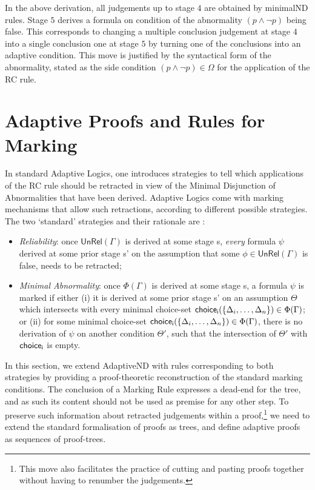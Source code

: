 \documentclass[]{article}
\newcommand{\Unrel}{\ensuremath{\mathsf{UnRel}}}
\begin{document}
In the above derivation, all judgements up to stage $4$ are obtained by {\sf minimalND} rules. Stage $5$ derives a formula on condition of the abnormality $(p\wedge \neg p)$ being false.  This corresponds to changing a multiple conclusion judgement at stage $4$ into a single conclusion one at stage $5$ by turning one of the conclusions into an adaptive condition. This move is justified by the syntactical form of the abnormality, stated as the side condition $(p \wedge \neg p)\in \Omega$ for the application of the {\sf RC} rule.



\section{Adaptive Proofs and Rules for Marking}\label{sec:marking}

In standard Adaptive Logics, one introduces strategies to tell which applications of the {\sf RC} rule should be retracted in view of the Minimal Disjunction of Abnormalities that have been derived. Adaptive Logics come with marking mechanisms that allow such retractions, according to different possible strategies. The two `standard' strategies and their rationale are \cite{batens01}:

\begin{itemize}
    \item \textit{Reliability}: once $\Unrel(\Gamma)$ is derived at some stage {\sf s}, \textit{every} formula $\psi$ derived at some prior stage {\sf s'} on the assumption that some $\phi\in \Unrel(\Gamma)$ is false, needs to be retracted;

\item \textit{Minimal Abnormality}: once $\Phi(\Gamma)$ is derived at some stage {\sf s}, a formula $\psi$ is marked if either (i) it is derived at some prior stage {\sf s'} on an assumption $\Theta$ which intersects with every minimal choice-set ${\sf choice_{i}}(\{\Delta_{i}, \ldots, \Delta_{n}\})\in \Phi(\Gamma)$; or (ii) for some minimal choice-set ${\sf choice_{i}}(\{\Delta_{i}, \ldots, \Delta_{n}\})\in \Phi(\Gamma)$, there is no derivation of $\psi$ on another condition $\Theta'$, such that the intersection of $\Theta'$ with ${\sf choice_{i}}$ is empty.
\end{itemize}
%
In this section, we extend {\sf AdaptiveND} with rules corresponding to both strategies by providing a proof-theoretic reconstruction of the standard marking conditions. The conclusion of a Marking Rule expresses a dead-end for the tree, and as such its content should not be used as premise for any other step. To preserve such information about retracted judgements within a proof,\footnote{This move also facilitates the practice of cutting and pasting proofs together without having to renumber the judgements.} we need to extend the standard formalisation of proofs as trees, and define adaptive proofs as sequences of proof-trees.
\end{document}
